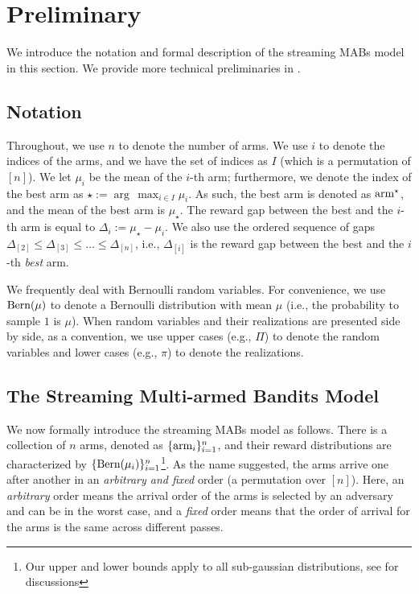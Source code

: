 \section{Preliminary}\label{sec:prelim}
We introduce the notation and formal description of the streaming MABs model in this section. We provide more technical preliminaries in .

\subsection{Notation}
\label{subsec:notation}
Throughout, we use $n$ to denote the number of arms. We use $i$ to denote the indices of the arms, and we have the set of indices as \(I\) (which is a permutation of $[n]$). We let \(\mu_i\) be the mean of the $i$-th arm; furthermore, we denote the index of the best arm as \(\star:= \arg\,\max_{i \in I} \mu_i \). As such, the best arm is denoted as $\textnormal{arm}^{\star}$, and the mean of the best arm is \(\mu_{\star}\). The reward gap between the best and the \(i\)-th arm is equal to \(\Delta_i := \mu_{\star} - \mu_i\). We also use the ordered sequence of gaps \(\Delta_{[2]} \le \Delta_{[3]} \le \dotsc \le \Delta_{[n]}\), i.e., $\Delta_{[i]}$ is the reward gap between the best and the $i$-th \emph{best} arm.

We frequently deal with Bernoulli random variables. For convenience, we use $\textnormal{Bern}(\mu)$ to denote a Bernoulli distribution with mean $\mu$ (i.e., the probability to sample $1$ is $\mu$). When random variables and their realizations are presented side by side, as a convention, we use upper cases (e.g., $\Pi$) to denote the random variables and lower cases (e.g., $\pi$) to denote the realizations.

\subsection{The Streaming Multi-armed Bandits Model}
\label{subsec:model}
We now formally introduce the streaming MABs model as follows. There is a collection of $n$ arms, denoted as $\{\textnormal{arm}_{i}\}_{i=1}^{n}$, and their reward distributions are characterized by $\{\textnormal{Bern}(\mu_{i})\}_{i=1}^{n}$\footnote{Our upper and lower bounds apply to all sub-gaussian distributions, see  for discussions}. As the name suggested, the arms arrive one after another in an \emph{arbitrary and fixed} order (a permutation over $[n]$). Here, an \emph{arbitrary} order means the arrival order of the arms is selected by an adversary and can be in the worst case, and a \emph{fixed} order means that the order of arrival for the arms is the same across different passes. 


